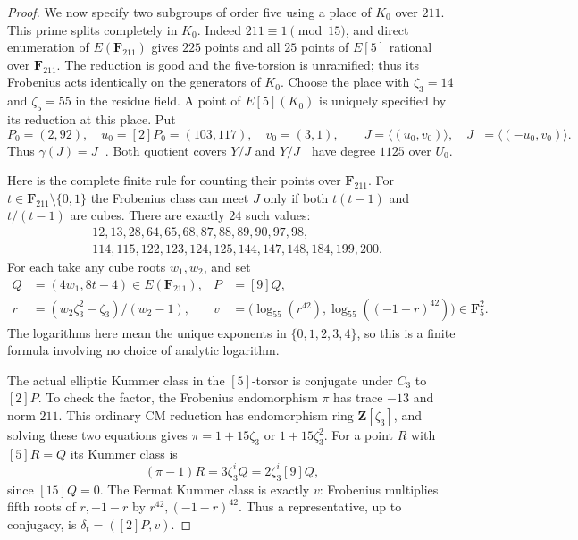 \begin{proof}
We now specify two subgroups of order five using a place
of $K_0$ over $211$. This prime splits completely in $K_0$.
Indeed $211\equiv1\pmod{15}$, and direct enumeration of
$E(\mathbf F_{211})$ gives $225$ points and all $25$ points
of $E[5]$ rational over $\mathbf F_{211}$. The reduction
is good and the five-torsion is unramified; thus its
Frobenius acts identically on the generators of $K_0$.
Choose the place with $\zeta_3=14$ and $\zeta_5=55$ in
the residue field. A point of $E[5](K_0)$ is uniquely
specified by its reduction at this place. Put
\[
 P_0=(2,92),\quad u_0=[2]P_0=(103,117),\quad v_0=(3,1),
 \qquad
 J=\langle(u_0,v_0)\rangle,
 \quad J_-=\langle(-u_0,v_0)\rangle.                          \tag{A20}
\]
Thus $\gamma(J)=J_-$. Both quotient covers $Y/J$ and
$Y/J_-$ have degree $1125$ over $U_0$.

Here is the complete finite rule for counting their points
over $\mathbf F_{211}$. For $t\in\mathbf F_{211}\setminus\{0,1\}$
the Frobenius class can meet $J$ only if both $t(t-1)$ and
$t/(t-1)$ are cubes. There are exactly $24$ such values:
\[
\begin{aligned}
 &12,13,28,64,65,68,87,88,89,90,97,98,\\
 &114,115,122,123,124,125,144,147,148,184,199,200.
\end{aligned}                                                   \tag{A21}
\]
For each take any cube roots $w_1,w_2$, and set
\[
 \begin{aligned}
 Q&=(4w_1,8t-4)\in E(\mathbf F_{211}),& P&=[9]Q,\\
 r&=(w_2\zeta_3^2-\zeta_3)/(w_2-1),&
 v&=\bigl(\log_{55}(r^{42}),
             \log_{55}((-1-r)^{42})\bigr)\in\mathbf F_5^2.
 \end{aligned}                                                   \tag{A22}
\]
The logarithms here mean the unique exponents in
$\{0,1,2,3,4\}$, so this is a finite formula involving no
choice of analytic logarithm.

The actual elliptic Kummer class in the $[5]$-torsor is
conjugate under $C_3$ to $[2]P$. To check the factor,
the Frobenius endomorphism $\pi$ has trace $-13$ and
norm $211$. This ordinary CM reduction has endomorphism
ring $\mathbf Z[\zeta_3]$, and solving these two equations
gives $\pi=1+15\zeta_3$ or $1+15\zeta_3^2$. For a point
$R$ with $[5]R=Q$ its Kummer class is
\[
 (\pi-1)R=3\zeta_3^iQ
             =2\zeta_3^i[9]Q,
\]
since $[15]Q=0$. The Fermat Kummer class is exactly $v$:
Frobenius multiplies fifth roots of $r,-1-r$ by
$r^{42},(-1-r)^{42}$. Thus a representative, up to
conjugacy, is $\delta_t=([2]P,v)$.


\end{proof}
